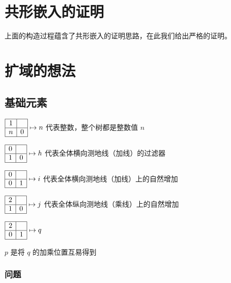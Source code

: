 \documentclass[a4paper,12pt]{article}
\begin{document}
\newpage

\section{共形嵌入的证明}

上面的构造过程蕴含了共形嵌入的证明思路，在此我们给出严格的证明。

\newpage

\section{扩域的想法}

\subsection{基础元素}

$\begin{array}{|c|c|}\hline 1&\space\\\hline n&0\\\hline\end{array} \mapsto n$ 代表整数，整个树都是整数值 $n$

$\begin{array}{|c|c|}\hline0&\space\\\hline 1&0\\\hline\end{array} \mapsto h$ 代表全体横向测地线（加线）的过滤器

$\begin{array}{|c|c|}\hline0&\space\\\hline 0&1\\\hline\end{array} \mapsto i$ 代表全体横向测地线（加线）上的自然增加

$\begin{array}{|c|c|}\hline2&\space\\\hline 1&0\\\hline\end{array} \mapsto j$ 代表全体纵向测地线（乘线）上的自然增加

$\begin{array}{|c|c|}\hline2&\space\\\hline 0&1\\\hline\end{array} \mapsto q$

$p$ 是将 $q$ 的加乘位置互易得到

\subsubsection{问题}
\end{document}

